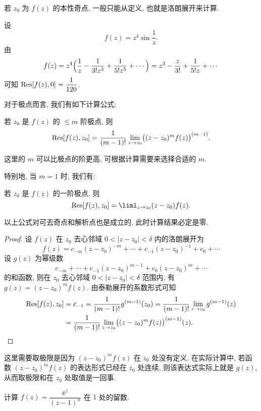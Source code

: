 若 $z_0$ 为 $f(z)$ 的本性奇点, 一般只能从定义, 也就是洛朗展开来计算.

\begin{example}
  设
  \[
    f(z)=z^4\sin\frac1z.
  \]
  由
  \[
     f(z)
    =z^4\Bigl(\frac1z-\frac1{3!z^3}+\frac1{5!z^5}+\cdots\Bigr)
    =z^3-\frac z{3!}+\frac1{5!z}+\cdots
  \]
  可知 ${\mathrm{Res}}[f(z),0]=\dfrac1{120}$.
\end{example}

对于极点而言, 我们有如下计算公式:

\begin{theorem}[留数计算公式 I]
  \label{thm:residue-formula-for-pole}
  若 $z_0$ 是 $f(z)$ 的 $\le m$ 阶极点, 则
  \[
    {\mathrm{Res}}[f(z),z_0]=\frac1{(m-1)!}\lim_{z\rightarrow z_0}\bigl((z-z_0)^mf(z)\bigr)^{(m-1)}.
  \]
\end{theorem}

这里的 $m$ 可以比极点的阶更高, 可根据计算需要来选择合适的 $m$.

特别地, 当 $m=1$ 时, 我们有:
\begin{theorem}[留数计算公式 II]
  若 $z_0$ 是 $f(z)$ 的一阶极点, 则
  \[
    \Res[f(z),z_0]=\liml_{z\ra z_0}(z-z_0)f(z).
  \]
\end{theorem}
以上公式对可去奇点和解析点也是成立的, 此时计算结果必定是零.

\begin{proof}
  设 $f(z)$ 在 $z_0$ 去心邻域 $0<|z-z_0|<\delta$ 内的洛朗展开为
  \[
    f(z)=c_{-m}(z-z_0)^{-m}+\cdots+c_{-1}(z-z_0)^{-1}+c_0+\cdots
  \]
  设 $g(z)$ 为幂级数
  \[
    c_{-m}+\cdots+c_{-1}(z-z_0)^{m-1}+c_0(z-z_0)^m+\cdots
  \]
  的和函数, 则在 $z_0$ 去心邻域 $0<|z-z_0|<\delta$ 范围内, 有 $g(z)=(z-z_0)^mf(z)$.
  由泰勒展开的系数形式可知
  \begin{align*}
     {\mathrm{Res}}[f(z),z_0]&
    =c_{-1}
    =\frac1{(m-1)!}g^{(m-1)}(z_0)
    =\frac1{(m-1)!}\lim_{z\rightarrow z_0}g^{(m-1)}(z)\\&
    =\frac1{(m-1)!}\lim_{z\rightarrow z_0}\bigl((z-z_0)^mf(z)\bigr)^{(m-1)}(z).\qedhere
  \end{align*}
\end{proof}

这里需要取极限是因为 $(z-z_0)^mf(z)$ 在 $z_0$ 处没有定义.
在实际计算中, 若函数 $(z-z_0)^mf(z)$ 的表达形式已经在 $z_0$ 处连续, 则该表达式实际上就是 $g(z)$, 从而取极限和在 $z_0$ 处取值是一回事.

\begin{example}
  计算 $f(z)=\dfrac{\ee^z}{(z-1)^n}$ 在 $1$ 处的留数.
\end{example}


